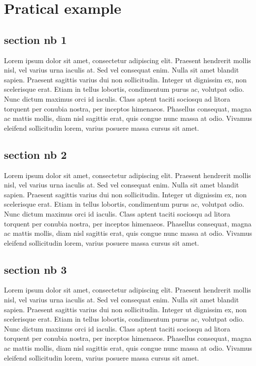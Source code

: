 \documentclass[a4paper, 11pt]{report}
\begin{document}


\chapter{Pratical example}%


\section{section nb 1}

Lorem ipsum dolor sit amet, consectetur adipiscing elit.
Praesent hendrerit mollis nisl, vel varius urna iaculis at.
Sed vel consequat enim.
Nulla sit amet blandit sapien.
Praesent sagittis varius dui non sollicitudin.
Integer ut dignissim ex, non scelerisque erat.
Etiam in tellus lobortis, condimentum purus ac, volutpat odio.
Nunc dictum maximus orci id iaculis.
Class aptent taciti sociosqu ad litora torquent per conubia nostra, 
per inceptos himenaeos.
Phasellus consequat, magna ac mattis mollis, diam nisl sagittis erat, 
quis congue nunc massa at odio.
Vivamus eleifend sollicitudin lorem, varius posuere massa cursus sit 
amet.

\section{section nb 2}

Lorem ipsum dolor sit amet, consectetur adipiscing elit.
Praesent hendrerit mollis nisl, vel varius urna iaculis at.
Sed vel consequat enim.
Nulla sit amet blandit sapien.
Praesent sagittis varius dui non sollicitudin.
Integer ut dignissim ex, non scelerisque erat.
Etiam in tellus lobortis, condimentum purus ac, volutpat odio.
Nunc dictum maximus orci id iaculis.
Class aptent taciti sociosqu ad litora torquent per conubia nostra, 
per inceptos himenaeos.
Phasellus consequat, magna ac mattis mollis, diam nisl sagittis erat, 
quis congue nunc massa at odio.
Vivamus eleifend sollicitudin lorem, varius posuere massa cursus sit 
amet.

\section{section nb 3}

Lorem ipsum dolor sit amet, consectetur adipiscing elit.
Praesent hendrerit mollis nisl, vel varius urna iaculis at.
Sed vel consequat enim.
Nulla sit amet blandit sapien.
Praesent sagittis varius dui non sollicitudin.
Integer ut dignissim ex, non scelerisque erat.
Etiam in tellus lobortis, condimentum purus ac, volutpat odio.
Nunc dictum maximus orci id iaculis.
Class aptent taciti sociosqu ad litora torquent per conubia nostra, 
per inceptos himenaeos.
Phasellus consequat, magna ac mattis mollis, diam nisl sagittis erat, 
quis congue nunc massa at odio.
Vivamus eleifend sollicitudin lorem, varius posuere massa cursus sit 
amet.
\end{document}
